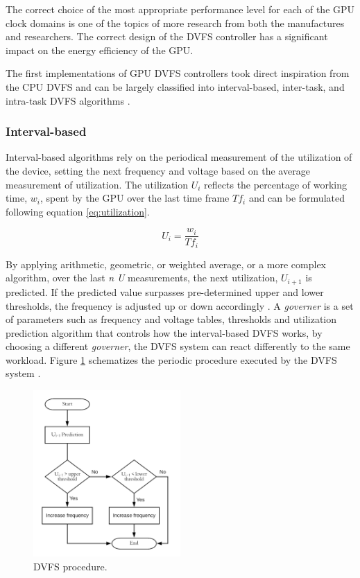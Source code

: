 The correct choice of the most appropriate performance level for each of the GPU clock domains is one of the topics of more research from both the manufactures and researchers. The correct design of the DVFS controller has a significant impact on the energy efficiency of the GPU.

The first implementations of GPU DVFS controllers took direct inspiration from the CPU DVFS and can be largely classified into interval-based, inter-task, and intra-task DVFS algorithms \cite{boyer_improving_2013}. 

\subsubsection{Interval-based}

Interval-based algorithms rely on the periodical measurement of the utilization of the device, setting the next frequency and voltage based on the average measurement of utilization. The utilization $U_{i}$ reflects the percentage of working time, $w_{i}$, spent by the GPU over the last time frame  $Tf_{i}$ and can be formulated following equation \ref{eq:utilization}.

\begin{equation}
    U_i=\frac{w_i}{Tf_i}
    \label{eq:utilization}
\end{equation}

By applying arithmetic, geometric, or weighted average, or a more complex algorithm, over the last \textit{n} \textit{U} measurements,  the next utilization, $U_{i+1}$ is predicted. If the predicted value surpasses pre-determined upper and lower thresholds, the frequency is adjusted up or down accordingly \cite{seongki_gpgpu-perf:_nodate}. 
A \textit{governer} is a set of parameters such as frequency and voltage tables, thresholds and utilization prediction algorithm that controls how the interval-based DVFS works, by choosing a different \textit{governer}, the DVFS system can react differently to the same workload. Figure \ref{fig:DVFSprocedure} schematizes the periodic procedure executed by the DVFS system \cite{seongki_gpgpu-perf:_nodate}. 

\begin{figure}[!htb]
  \centering
  \includegraphics[width=0.5\textwidth]{Figures/StateArt/DVFSprogram.png}
  \caption[Controller]{DVFS procedure.}
  \label{fig:DVFSprocedure}
\end{figure}

